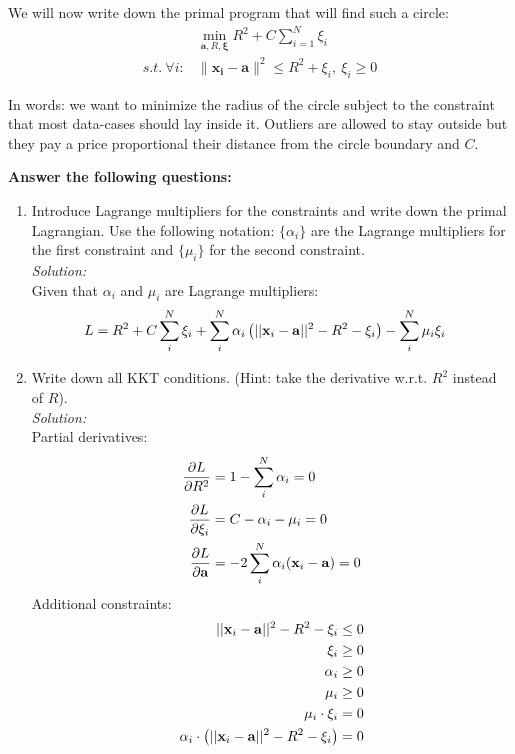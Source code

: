 \documentclass[12pt,a4paper]{article}
\newcommand{\lp}{\left(}
\newcommand{\rp}{\right)}
\newcommand{\xscalar}{x}
\newcommand{\xvec}{{\bf \xscalar}}
\newcommand{\avec}{\mathbf{a}}
\begin{document}
We will now write down the primal program that will find such a circle:
\begin{align*}
&\min_{\boldsymbol{a},R,\boldsymbol{\xi}} R^2+C \sum_{i=1}^N \xi_i\\
s.t.~\forall i : &\| \boldsymbol{x_i} - \boldsymbol{a} \|^2 \le R^2 + \xi_i,~\xi_i \ge 0
\end{align*}

In words: we want to minimize the radius of the circle subject to the constraint that most data-cases should lay inside it. Outliers are allowed to stay outside but they pay a price proportional their distance from the circle boundary and $C$.

{\bf Answer the following questions:}

\begin{enumerate}
\item Introduce Lagrange multipliers for the constraints and write down the primal Lagrangian. Use the following notation: $\{\alpha_i\}$ are the Lagrange multipliers for the first constraint and $\{\mu_i\}$ for the second constraint.\\
	\emph{Solution:} \\
		Given that $\alpha_i$ and $\mu_i$ are Lagrange multipliers:
			\begin{align*}
			L &= R^2 + C \sum_i^N \xi_i + \sum_i^N \alpha_i \lp ||\xvec_i - \avec||^2 - R^2 - \xi_i \rp - \sum_i^N \mu_i \xi_i
			\end{align*}

\item Write down all KKT conditions. (Hint: take the derivative w.r.t. $R^2$ instead of $R$). \\
	\emph{Solution:} \\
		Partial derivatives:
			\begin{align}
				\frac{\partial L}{\partial R^2} &= 1 - \sum_i^N \alpha_i = 0 \\
				\frac{\partial L}{\partial \xi_i} &= C - \alpha_i - \mu_i = 0 \\
				\frac{\partial L}{\partial \avec} &= -2 \sum_i^N \alpha_i ( \xvec_i - \avec)  = 0
			\end{align}
		Additional constraints:
			\begin{align}
				||\xvec_i - \avec||^2 - R^2 - \xi_i &\leq 0 \\
				\xi_i &\geq 0 \\
				\alpha_i &\geq 0 \\
				\mu_i &\geq 0 \\
				\mu_i \cdot \xi_i &= 0 \\
				\alpha_i \cdot \lp ||\xvec_i - \avec||^2 - R^2 - \xi_i \rp &= 0
			\end{align}



\end{enumerate}
\end{document}
